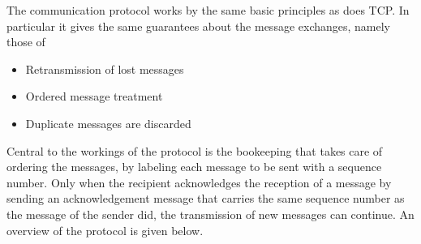 The communication protocol works by the same basic principles as does TCP. In
particular it gives the same guarantees about the message exchanges, namely
those of

\begin{itemize}

\item Retransmission of lost messages

\item Ordered message treatment %

\item Duplicate messages are discarded

\end{itemize}

Central to the workings of the protocol is the bookeeping that takes care of
ordering the messages, by labeling each message to be sent with a sequence
number. Only when the recipient acknowledges the reception of a message by
sending an acknowledgement message that carries the same sequence number as the
message of the sender did, the transmission of new messages can continue.  An
overview of the protocol is given below.

